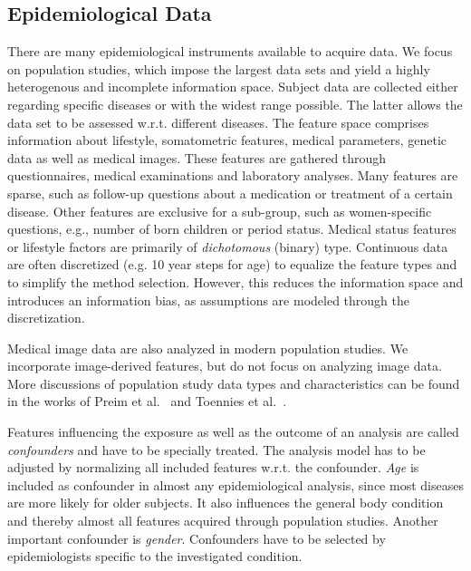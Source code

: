\documentclass[journal]{style/vgtc} 			          %
\begin{document}
\subsection{Epidemiological Data} \label{sec:EpidemiologicalData}
There are many epidemiological instruments available to acquire data. %
We focus on population studies, which impose the largest data sets and yield a highly heterogenous and incomplete information space.
Subject data are collected either regarding specific diseases or with the widest range possible.
The latter allows the data set to be assessed w.r.t. different diseases.
The feature space comprises information about lifestyle, somatometric features, medical parameters, genetic data as well as medical images.
These features are gathered through questionnaires, medical examinations and laboratory analyses.
Many features are sparse, such as follow-up questions about a medication or treatment of a certain disease.
Other features are exclusive for a sub-group, such as women-specific questions, e.g., number of born children or period status.
Medical status features or lifestyle factors are primarily of \emph{dichotomous} (binary) type.
Continuous data are often discretized (e.g. 10 year steps for age) to equalize the feature types and to simplify the method selection.
However, this reduces the information space and introduces an information bias, as assumptions are modeled through the discretization.

Medical image data are also analyzed in modern population studies.
We incorporate image-derived features, but do not focus on analyzing image data.
More discussions of population study data types and characteristics can be found in the works of Preim et al.~\cite{Preim2014} and Toennies et al.~\cite{Toennies2015}.

Features influencing the exposure as well as the outcome of an analysis are called \emph{confounders} and have to be specially treated.
The analysis model has to be adjusted by normalizing all included features w.r.t. the confounder.
\emph{Age} is included as confounder in almost any epidemiological analysis, since most diseases are more likely for older subjects.
It also influences the general body condition and thereby almost all features acquired through population studies.
Another important confounder is \emph{gender}.
Confounders have to be selected by epidemiologists specific to the investigated condition.
\end{document}
